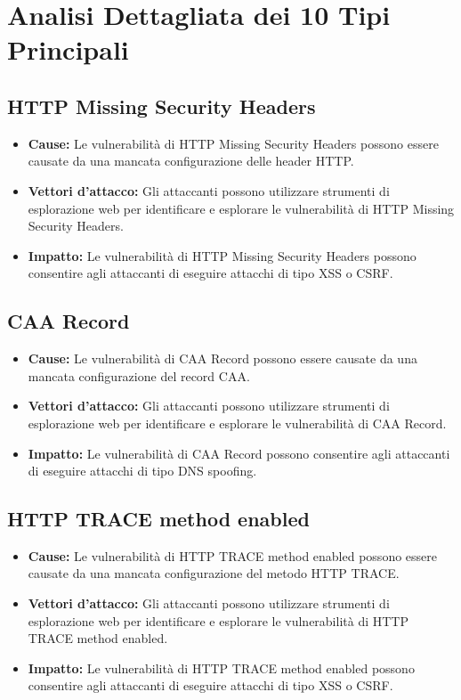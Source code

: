 \section{Analisi Dettagliata dei 10 Tipi Principali}

\subsection{HTTP Missing Security Headers}
\begin{itemize}
\item \textbf{Cause:} Le vulnerabilità di HTTP Missing Security Headers possono essere causate da una mancata configurazione delle header HTTP.
\item \textbf{Vettori d'attacco:} Gli attaccanti possono utilizzare strumenti di esplorazione web per identificare e esplorare le vulnerabilità di HTTP Missing Security Headers.
\item \textbf{Impatto:} Le vulnerabilità di HTTP Missing Security Headers possono consentire agli attaccanti di eseguire attacchi di tipo XSS o CSRF.
\end{itemize}
\subsection{CAA Record}
\begin{itemize}
\item \textbf{Cause:} Le vulnerabilità di CAA Record possono essere causate da una mancata configurazione del record CAA.
\item \textbf{Vettori d'attacco:} Gli attaccanti possono utilizzare strumenti di esplorazione web per identificare e esplorare le vulnerabilità di CAA Record.
\item \textbf{Impatto:} Le vulnerabilità di CAA Record possono consentire agli attaccanti di eseguire attacchi di tipo DNS spoofing.
\end{itemize}
\subsection{HTTP TRACE method enabled}
\begin{itemize}
\item \textbf{Cause:} Le vulnerabilità di HTTP TRACE method enabled possono essere causate da una mancata configurazione del metodo HTTP TRACE.
\item \textbf{Vettori d'attacco:} Gli attaccanti possono utilizzare strumenti di esplorazione web per identificare e esplorare le vulnerabilità di HTTP TRACE method enabled.
\item \textbf{Impatto:} Le vulnerabilità di HTTP TRACE method enabled possono consentire agli attaccanti di eseguire attacchi di tipo XSS o CSRF.
\end{itemize}
